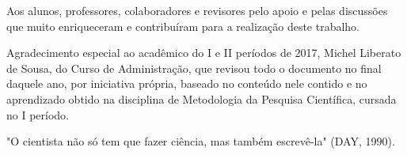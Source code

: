 \documentclass[a4paper,12pt]{article}  %
\begin{document}
\begin{ElementosPreTextuais}

\begin{FolhaDeRosto} %
\end{FolhaDeRosto}

\begin{Errata} %
\end{Errata}

\begin{FolhaDeAprovacao} %
\end{FolhaDeAprovacao}

\begin{Dedicatoria} %
\end{Dedicatoria}

\begin{Agradecimentos} %
Aos alunos, professores, colaboradores e revisores pelo apoio e pelas discussões que muito enriqueceram e contribuíram para a realização deste trabalho.

Agradecimento especial ao acadêmico do I e II períodos de 2017, Michel Liberato de Sousa, do Curso de Administração, que revisou todo o documento no final daquele ano, por iniciativa própria, baseado no conteúdo nele contido e no aprendizado obtido na disciplina de Metodologia da Pesquisa Científica, cursada no I período.
\end{Agradecimentos}

\begin{Epigrafe} %
"O cientista não só tem que fazer ciência, mas também escrevê-la" (DAY, 1990).
\end{Epigrafe}

\begin{Resumo} %
\end{Resumo}


\end{ElementosPreTextuais}
\end{document}
